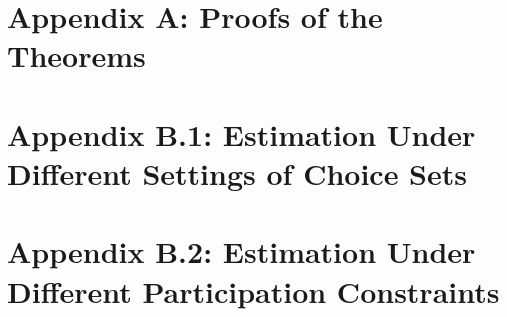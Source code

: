 \documentclass[11pt, english]{article}
\theoremstyle{plain}
\theoremstyle{definition}
\begin{document}
\begin{spacing}{1.5}

  \section*{Appendix A: Proofs of the Theorems}
  \label{sec:proofs}
  

  \section*{Appendix B.1: Estimation Under Different Settings of Choice Sets}
  \label{sec:robustness checks 1}
  

  \section*{Appendix B.2: Estimation Under Different Participation Constraints}
  \label{sec:robustness checks 2}
  







  


\end{spacing}
\end{document}
